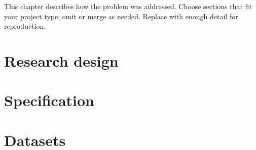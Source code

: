 %
%

This chapter describes how the problem was addressed. Choose sections that fit your project type; omit or merge as needed. Replace with enough detail for reproduction.

\lipsum[9-10]

\section{Research design}\label{sec:research-design}

\lipsum[11-12]

\section{Specification}\label{sec:spec}

\lipsum[13-14]

\section{Datasets}\label{sec:datasets}

